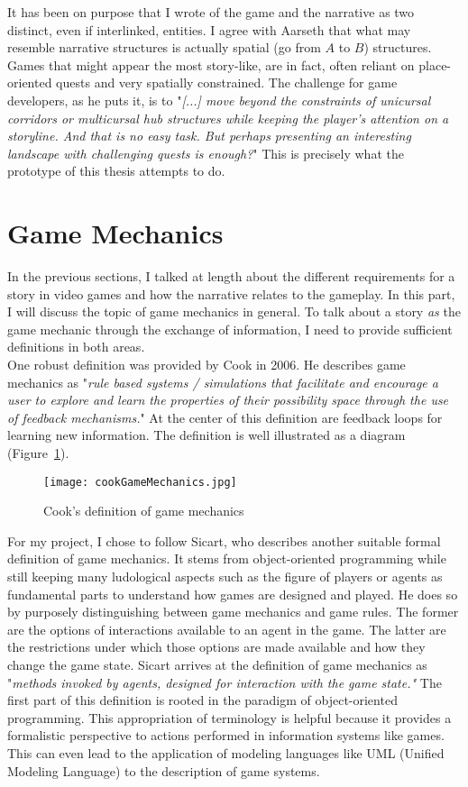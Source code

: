 It has been on purpose that I wrote of the game and the narrative as two distinct, even if interlinked, entities. I agree with Aarseth that what may resemble narrative structures is actually spatial (go from $A$ to $B$) structures. Games that might appear the most story-like, are in fact, often reliant on place-oriented quests and very spatially constrained. The challenge for game developers, as he puts it, is to "\textit{[...] move beyond the constraints of unicursal corridors or multicursal hub structures while keeping the player’s attention on a storyline. And that is no easy task. But perhaps presenting an interesting landscape with challenging quests is enough?}" This is precisely what the prototype of this thesis attempts to do.~\cite{Aarseth2005}
\section{Game Mechanics}
In the previous sections, I talked at length about the different requirements for a story in video games and how the narrative relates to the gameplay. In this part, I will discuss the topic of game mechanics in general. To talk about a story \textit{as} the game mechanic through the exchange of information, I need to provide sufficient definitions in both areas.\\
One robust definition was provided by Cook in 2006. He describes game mechanics as "\textit{rule based systems / simulations that facilitate and encourage a user to explore and learn the properties of their possibility space through the use of feedback mechanisms.}" At the center of this definition are feedback loops for learning new information. The definition is well illustrated as a diagram (Figure~\ref{fig:cookGameMechanics}).~\cite{Cook2006}\\
\begin{figure}
	\centering
	\texttt{[image: cookGameMechanics.jpg]}
	\caption{Cook's definition of game mechanics~\cite{Cook2006}}
	\label{fig:cookGameMechanics}
\end{figure}
For my project, I chose to follow Sicart, who describes another suitable formal definition of game mechanics. It stems from object-oriented programming while still keeping many ludological aspects such as the figure of players or agents as fundamental parts to understand how games are designed and played. He does so by purposely distinguishing between game mechanics and game rules. The former are the options of interactions available to an agent in the game. The latter are the restrictions under which those options are made available and how they change the game state. Sicart arrives at the definition of game mechanics as "\textit{methods invoked by agents, designed for interaction with the game state."} The first part of this definition is rooted in the paradigm of object-oriented programming. This appropriation of terminology is helpful because it provides a formalistic perspective to actions performed in information systems like games. This can even lead to the application of modeling languages like UML (Unified Modeling Language) to the description of game systems.~\cite{Sicart2008}\\
